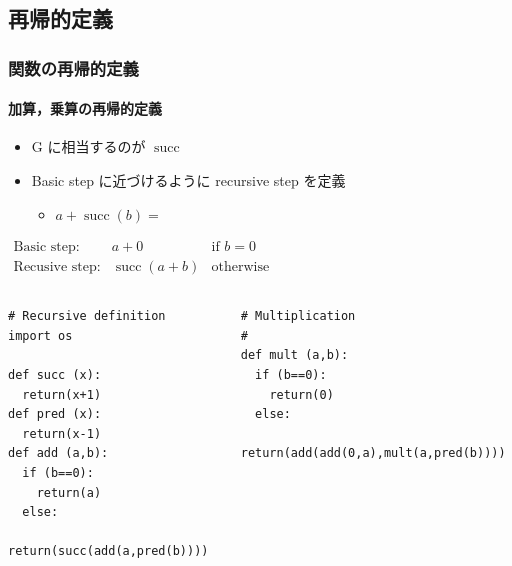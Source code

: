 \subsection{再帰的定義}
\begin{frame}
\frametitle{関数の再帰的定義}
\framesubtitle{加算，乗算の再帰的定義}
   \begin{itemize}
\item G に相当するのが \(\operatorname{succ}\)
\item Basic step に近づけるように recursive step を定義
     \begin{itemize}
\item \(a+\operatorname{succ}(b)=\)
     \end{itemize}
  \end{itemize}
\vspace{-1em}
  \begin{center}
  \begin{math}
    \begin{array}{lll}
\mbox{Basic step:}& a+0 & \mbox{if }b=0 \\
\mbox{Recusive step:}& \operatorname{succ}(a+b) & \mbox{otherwise}
    \end{array}
  \end{math}  
  \end{center}
\vspace{-2em}
  \begin{columns}
    \begin{column}[t]{0.4\textwidth}
      \begin{lstlisting}[caption={加算},label=add-rec]
# Recursive definition
import os

def succ (x):
  return(x+1)
def pred (x):
  return(x-1)
def add (a,b):
  if (b==0):
    return(a)
  else:
    return(succ(add(a,pred(b))))
      \end{lstlisting}
    \end{column}
    \begin{column}[t]{0.55\textwidth}
      \begin{lstlisting}[firstnumber=15,caption={乗算},label=mult-rec]
# Multiplication
#
def mult (a,b):
  if (b==0):
    return(0)
  else:
    return(add(add(0,a),mult(a,pred(b))))
      \end{lstlisting}
    \end{column}
  \end{columns}
\end{frame}
